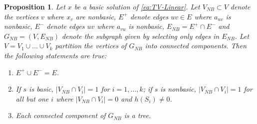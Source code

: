 \documentclass[10pt,a4paper]{amsart}
\newtheorem{proposition}{Proposition}
\begin{document}
\begin{proposition} \label{prop:tv-linear-basic}
    Let $x$ be a basic solution of \eqref{eq:TV-Linear}. Let $V_{NB} \subset V$ denote the vertices $v$ where $x_v$ are nonbasic, $E^+$ denote edges $uv \in E$ where $a_{uv}$ is nonbasic, $E^-$ denote edges $uv$ where $a_{vu}$ is nonbasic, $E_{NB} = E^+ \cap E^-$ and $G_{NB} = (V, E_{NB})$ denote the subgraph given by selecting only edges in $E_{NB}$. Let $V= V_1 \cup\dots \cup V_k$ partition the vertices of $G_{NB}$ into connected components. Then the following statements are true:
    \begin{enumerate}
        \item $E^+ \cup E^- = E$.
        \item If $s$ is basic, $|V_{NB} \cap V_i| = 1$ for $i=1,\ldots,k$; if $s$ is nonbasic, $|V_{NB} \cap V_i| = 1$ for all but one $i$ where $|V_{NB} \cap V_i| = 0$ and $h(S_i) \ne 0$.
        \item Each connected component of $G_{NB}$ is a tree.
    \end{enumerate}
\end{proposition}
\end{document}
